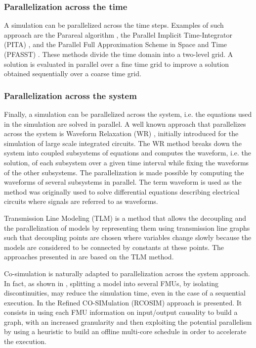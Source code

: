 \subsubsection{Parallelization across the time}

A simulation can be parallelized across the time steps. Examples of such approach are the Parareal algorithm \cite{lions:2001}, the Parallel Implicit Time-Integrator (PITA) \cite{farhat:2003}, and the Parallel Full Approximation Scheme in Space and Time (PFASST) \cite{emmett:2012}. These methods divide the time domain into a two-level grid. A solution is evaluated in parallel over a fine time grid to improve a solution obtained sequentially over a coarse time grid.
\subsubsection{Parallelization across the system}

Finally, a simulation can be parallelized across the system, i.e. the equations used in the simulation are solved in parallel. A well known approach that parallelizes across the system is Waveform Relaxation (WR) \cite{lelarasmee:1982}, initially introduced for the simulation of large scale integrated circuits. The WR method breaks down the system into coupled subsystems of equations and computes the waveform, i.e. the solution, of each subsystem over a given time interval while fixing the waveforms of the other subsystems. The parallelization is made possible by computing the waveforms of several subsystems in parallel. The term waveform is used as the method was originally used to solve differential equations describing electrical circuits where signals are referred to as waveforms. 

Transmission Line Modeling (TLM) \cite{hui:1990} is a method that allows the decoupling and the parallelization of models by representing them using transmission line graphs such that decoupling points are chosen where variables change slowly because the models are considered to be connected by constants at these points. The approaches presented in \cite{sjolund:2010,braun:2012} are based on the TLM method. 

Co-simulation is naturally adapted to parallelization across the system approach. In fact, as shown in \cite{Benkhaled_A_2012_ECOSM}, splitting a model into several FMUs, by isolating discontinuities, may reduce the simulation time, even in the case of a sequential execution. In \cite{benkhaled:2014} the Refined CO-SIMulation (RCOSIM) approach is presented. It consists in using each FMU information on input/output causality to build a graph, with an increased granularity and then exploiting the potential parallelism by using a heuristic to build an offline multi-core schedule in order to accelerate the execution.

